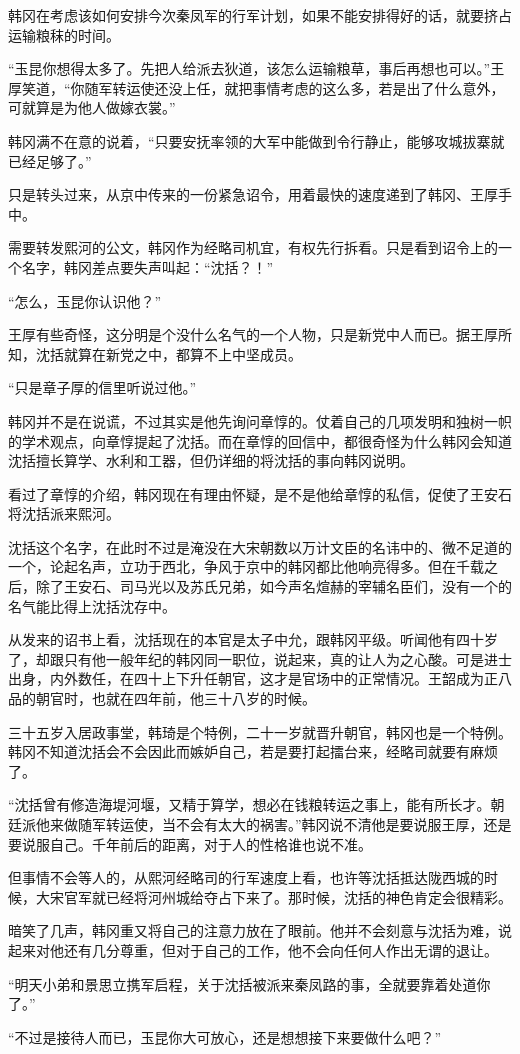 韩冈在考虑该如何安排今次秦凤军的行军计划，如果不能安排得好的话，就要挤占运输粮秣的时间。

“玉昆你想得太多了。先把人给派去狄道，该怎么运输粮草，事后再想也可以。”王厚笑道，“你随军转运使还没上任，就把事情考虑的这么多，若是出了什么意外，可就算是为他人做嫁衣裳。”

韩冈满不在意的说着，“只要安抚率领的大军中能做到令行静止，能够攻城拔寨就已经足够了。”

只是转头过来，从京中传来的一份紧急诏令，用着最快的速度递到了韩冈、王厚手中。

需要转发熙河的公文，韩冈作为经略司机宜，有权先行拆看。只是看到诏令上的一个名字，韩冈差点要失声叫起：“沈括？！”

“怎么，玉昆你认识他？”

王厚有些奇怪，这分明是个没什么名气的一个人物，只是新党中人而已。据王厚所知，沈括就算在新党之中，都算不上中坚成员。

“只是章子厚的信里听说过他。”

韩冈并不是在说谎，不过其实是他先询问章惇的。仗着自己的几项发明和独树一帜的学术观点，向章惇提起了沈括。而在章惇的回信中，都很奇怪为什么韩冈会知道沈括擅长算学、水利和工器，但仍详细的将沈括的事向韩冈说明。

看过了章惇的介绍，韩冈现在有理由怀疑，是不是他给章惇的私信，促使了王安石将沈括派来熙河。

沈括这个名字，在此时不过是淹没在大宋朝数以万计文臣的名讳中的、微不足道的一个，论起名声，立功于西北，争风于京中的韩冈都比他响亮得多。但在千载之后，除了王安石、司马光以及苏氏兄弟，如今声名煊赫的宰辅名臣们，没有一个的名气能比得上沈括沈存中。

从发来的诏书上看，沈括现在的本官是太子中允，跟韩冈平级。听闻他有四十岁了，却跟只有他一般年纪的韩冈同一职位，说起来，真的让人为之心酸。可是进士出身，内外数任，在四十上下升任朝官，这才是官场中的正常情况。王韶成为正八品的朝官时，也就在四年前，他三十八岁的时候。

三十五岁入居政事堂，韩琦是个特例，二十一岁就晋升朝官，韩冈也是一个特例。韩冈不知道沈括会不会因此而嫉妒自己，若是要打起擂台来，经略司就要有麻烦了。

“沈括曾有修造海堤河堰，又精于算学，想必在钱粮转运之事上，能有所长才。朝廷派他来做随军转运使，当不会有太大的祸害。”韩冈说不清他是要说服王厚，还是要说服自己。千年前后的距离，对于人的性格谁也说不准。

但事情不会等人的，从熙河经略司的行军速度上看，也许等沈括抵达陇西城的时候，大宋官军就已经将河州城给夺占下来了。那时候，沈括的神色肯定会很精彩。

暗笑了几声，韩冈重又将自己的注意力放在了眼前。他并不会刻意与沈括为难，说起来对他还有几分尊重，但对于自己的工作，他不会向任何人作出无谓的退让。

“明天小弟和景思立携军启程，关于沈括被派来秦凤路的事，全就要靠着处道你了。”

“不过是接待人而已，玉昆你大可放心，还是想想接下来要做什么吧？”

